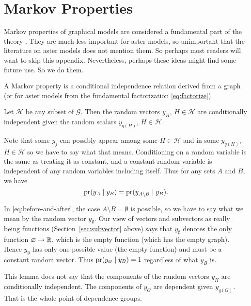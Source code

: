 
\chapter{Markov Properties}
\label{app:markov}

Markov properties of graphical models are considered a fundamental part
of the theory \citep[Chapter~3]{lauritzen}.  They are much less important
for aster models, so unimportant that the literature on aster models
does not mention them.
So perhaps most readers will want to skip this appendix.  Nevertheless,
perhaps these ideas might find some future use.  So we do them.

A Markov property is a conditional independence relation derived from a
graph (or for aster models from the fundamental factorization
\eqref{eq:factorize}).

\begin{lemma} \label{lem:markov}
Let $\mathcal{H}$ be any subset of $\mathcal{G}$.  Then the random vectors
$y_H$, $H \in \mathcal{H}$ are conditionally independent given
the random scalars $y_{q(H)}$, $H \in \mathcal{H}$.
\end{lemma}

Note that some $y_j$ can possibly appear among some $H \in \mathcal{H}$
and in some $y_{q(H)}$, $H \in \mathcal{H}$ so we have to say what that means.
Conditioning on a random variable is the same as treating it as constant,
and a constant random variable is independent of any random variables
including itself.  Thus for any sets $A$ and $B$, we have
\begin{equation} \label{eq:before-and-after}
   \operatorname{pr}(y_A \mid y_B)
   =
   \operatorname{pr}(y_{A \setminus B} \mid y_B).
\end{equation}

In \eqref{eq:before-and-after}, the case $A \setminus B = \emptyset$
is possible,
so we have to say what we mean by the random vector $y_\emptyset$.
Our view of vectors and subvectors as really
being functions (Section~\ref{sec:subvector} above) says that $y_\emptyset$
denotes the only function $\varnothing \to \mathbb{R}$, which is the empty function
(which has the empty graph).  Hence $y_\emptyset$ has only one possible
value (the empty function) and must be a constant random vector.
Thus $\operatorname{pr}(y_\varnothing \mid y_B) = 1$ regardless of what $y_B$ is.

This lemma does not say that the components of the random vectors $y_H$ are
conditionally independent.  The components of $y_G$ are dependent given
$y_{q(G)}$.  That is the whole point of dependence groups.

